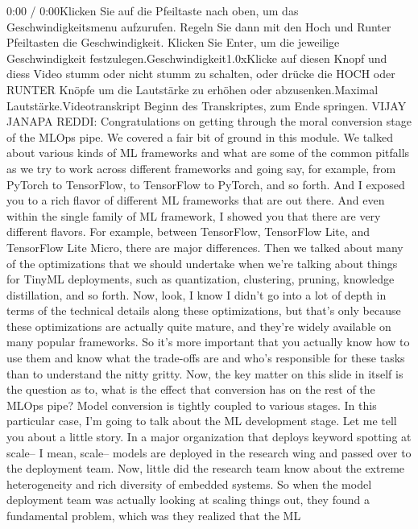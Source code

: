 {{{{{    0:00 / 0:00Klicken Sie auf die Pfeiltaste nach oben, um das Geschwindigkeitsmenu aufzurufen. Regeln Sie dann mit den Hoch und Runter Pfeiltasten die Geschwindigkeit. Klicken Sie Enter, um die jeweilige Geschwindigkeit festzulegen.Geschwindigkeit1.0xKlicke auf diesen Knopf und diess Video stumm oder nicht stumm zu schalten, oder drücke die HOCH oder RUNTER Knöpfe um die Lautstärke zu erhöhen oder abzusenken.Maximal Lautstärke.Videotranskript
    Beginn des Transkriptes, zum Ende springen.
    VIJAY JANAPA REDDI: Congratulations on getting through the moral conversion
    stage of the MLOps pipe.
    We covered a fair bit of ground in this module.
    We talked about various kinds of ML frameworks
    and what are some of the common pitfalls as we
    try to work across different frameworks and going say,
    for example, from PyTorch to TensorFlow, to TensorFlow to PyTorch, and so forth.
    And I exposed you to a rich flavor of different ML frameworks
    that are out there.
    And even within the single family of ML framework,
    I showed you that there are very different flavors.
    For example, between TensorFlow, TensorFlow Lite, and TensorFlow Lite
    Micro, there are major differences.
    Then we talked about many of the optimizations
    that we should undertake when we're talking
    about things for TinyML deployments, such as quantization, clustering,
    pruning, knowledge distillation, and so forth.
    Now, look, I know I didn't go into a lot of depth
    in terms of the technical details along these optimizations,
    but that's only because these optimizations are actually
    quite mature, and they're widely available on many popular frameworks.
    So it's more important that you actually know
    how to use them and know what the trade-offs are
    and who's responsible for these tasks than to understand the nitty gritty.
    Now, the key matter on this slide in itself
    is the question as to, what is the effect that conversion
    has on the rest of the MLOps pipe?
    Model conversion is tightly coupled to various stages.
    In this particular case, I'm going to talk about the ML development stage.
    Let me tell you about a little story.
    In a major organization that deploys keyword spotting at scale--
    I mean, scale-- models are deployed in the research wing
    and passed over to the deployment team.
    Now, little did the research team know about the extreme heterogeneity and
    rich diversity of embedded systems.
    So when the model deployment team was actually looking at scaling things out,
    they found a fundamental problem, which was they realized that the ML
}}}}}
